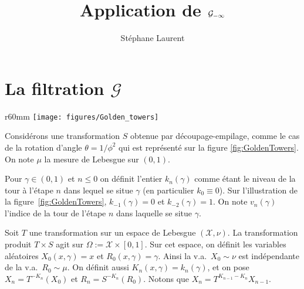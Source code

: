 \documentclass[12pt,a4paper]{article}
\author{Stéphane Laurent}
\title{Application de $\GG_{-\infty}$}
\begin{document}
\theoremstyle{defstyle}
\newtheorem{definition}{Definition}
\newtheorem{remark}{Remark}
\newtheorem{question}{Question}
\newtheorem{clarify}{To clarify}
\theoremstyle{thmstyle}
\newtheorem{thm}{Theorem}[section]
\newtheorem{ppsition}{Proposition}
\newtheorem{lemma}{Lemma}

\newcommand{\FF}{\mathcal{F}}
\newcommand{\GG}{\mathcal{G}}
\newcommand{\EE}{\mathbb{E}}
\newcommand{\II}{\mathcal{I}}
\newcommand{\LL}{\mathcal{L}}
\newcommand{\OO}{\mathcal{O}}
\newcommand{\XX}{\mathcal{X}}
\newcommand{\N}{\mathbb{N}}
\newcommand{\Z}{\mathbb{Z}}

\newcommand{\given}{\mid}
\newcommand{\eps}{\epsilon}
\newcommand{\indic}{\boldsymbol 1}
\newcommand{\Vb}{\boldsymbol V}

\newcommand{\indvee}{\dot{\vee}}
\newcommand{\indep}{\mathrel{\text{\scalebox{1.07}{$\perp\mkern-10mu\perp$}}}}

\maketitle

\section{La filtration $\GG$}


\begin{wrapfigure}{r}{60mm}
   \centering
   	\texttt{[image: figures/Golden\_towers]}
   \caption{Golden towers}
   \label{fig:GoldenTowers}
\end{wrapfigure}
Considérons une transformation $S$ obtenue par découpage-empilage, 
comme le cas de la rotation d'angle $\theta=1/\phi^2$ qui 
est représenté sur la figure \ref{fig:GoldenTowers}. 
On note $\mu$ la mesure de Lebesgue sur $(0,1)$. 

Pour $\gamma \in (0,1)$ et $n \leq 0$ on définit l'entier 
$k_n(\gamma)$ comme étant le niveau de la tour à l'étape $n$ 
dans lequel se situe $\gamma$ (en particulier $k_0 \equiv 0$). 
Sur l'illustration de la figure~\ref{fig:GoldenTowers}, 
$k_{-1}(\gamma) = 0$ et $k_{-2}(\gamma)=1$. 
On note $v_n(\gamma)$ l'indice de la tour de l'étape $n$ dans laquelle 
se situe $\gamma$.

Soit $T$ une transformation sur un espace de Lebesgue 
$(\XX, \nu)$. La transformation produit $T \times S$ 
agit sur $\Omega := \XX \times [0,1]$. 
Sur cet espace, on définit les variables aléatoires 
$X_0(x, \gamma)=x$ et $R_0(x, \gamma)=\gamma$. 
Ainsi la v.a.\ $X_0 \sim \nu$ est indépendante de la v.a.\ $R_0 \sim \mu$. 
On définit aussi $K_n(x,\gamma)=k_n(\gamma)$, et on 
pose $\boxed{X_n = T^{-K_n}(X_0)}$ et 
$\boxed{R_n = S^{-K_n}(R_0)}$. 
Notons que $X_n = T^{K_{n-1}-K_n}X_{n-1}$. 
\end{document}
